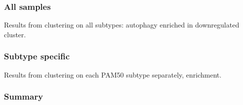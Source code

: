         \subsubsection{All samples}
        
        Results from clustering on all subtypes: autophagy enriched in downregulated cluster. 
        
        
        \subsubsection{Subtype specific}
        
        Results from clustering on each PAM50 subtype separately, enrichment.

        
        \subsubsection{Summary}

        
    
    
    
    
    
    
 



